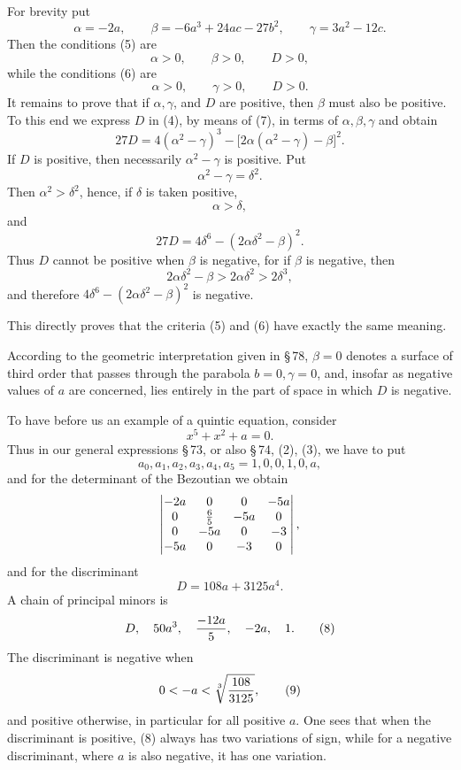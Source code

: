 \documentclass[11pt]{article}
\begin{document}
For brevity put
\begin{equation}
        \alpha=-2a,
        \qquad
        \beta=-6a^3+24ac-27b^2,
        \qquad
        \gamma=3a^2-12c.
\tag{7}
\end{equation}
Then the conditions (5) are
\[
        \alpha>0,
        \qquad \beta>0,
        \qquad D>0,
\]
while the conditions (6) are
\[
        \alpha>0,
        \qquad \gamma>0,
        \qquad D>0.
\]
It remains to prove that if $\alpha,\gamma$, and $D$ are positive, then $\beta$ must also be positive. To this end we express $D$ in (4), by means of (7), in terms of $\alpha,\beta,\gamma$ and obtain
\[
        27D=4(\alpha^2-\gamma)^3-\bigl[2\alpha(\alpha^2-\gamma)-\beta\bigr]^2.
\]
If $D$ is positive, then necessarily $\alpha^2-\gamma$ is positive. Put
\[
        \alpha^2-\gamma=\delta^2.
\]
Then $\alpha^2>\delta^2$, hence, if $\delta$ is taken positive,
\[
        \alpha>\delta,
\]
and
\[
        27D=4\delta^6-(2\alpha\delta^2-\beta)^2.
\]
Thus $D$ cannot be positive when $\beta$ is negative, for if $\beta$ is negative, then
\[
        2\alpha\delta^2-\beta>2\alpha\delta^2>2\delta^3,
\]
and therefore $4\delta^6-(2\alpha\delta^2-\beta)^2$ is negative.

This directly proves that the criteria (5) and (6) have exactly the same meaning.

According to the geometric interpretation given in \S\,78, $\beta=0$ denotes a surface of third order that passes through the parabola $b=0,\gamma=0$, and, insofar as negative values of $a$ are concerned, lies entirely in the part of space in which $D$ is negative.

To have before us an example of a quintic equation, consider
\[
        x^5+x^2+a=0.
\]
Thus in our general expressions \S\,73, or also \S\,74, (2), (3), we have to put
\[
        a_0,a_1,a_2,a_3,a_4,a_5=1,0,0,1,0,a,
\]
and for the determinant of the Bezoutian we obtain
\[
\begin{vmatrix}
 -2a&0&0&-5a\cr
 0&\frac65&-5a&0\cr
 0&-5a&0&-3\cr
 -5a&0&-3&0
\end{vmatrix},
\]
and for the discriminant
\[
        D=108a+3125a^4.
\]
A chain of principal minors is
\begin{equation}
        D,
        \quad 50a^3,
        \quad {-12a\over5},
        \quad -2a,
        \quad 1.
\tag{8}
\end{equation}
The discriminant is negative when
\begin{equation}
        0<-a<\sqrt[3]{108\over3125},
\tag{9}
\end{equation}
and positive otherwise, in particular for all positive $a$. One sees that when the discriminant is positive, (8) always has two variations of sign, while for a negative discriminant, where $a$ is also negative, it has one variation.
\end{document}
